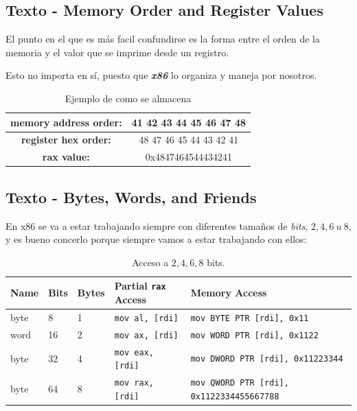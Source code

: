 \subsection{Texto - Memory Order and Register Values}\label{subsec:memory_order_and_register_values}

El punto en el que es más facil confundirse es la forma entre el orden de la
memoria y el valor que se imprime desde un registro.

Esto no importa en sí, puesto que \textbf{\textit{x86}} lo organiza y
maneja por nosotros.

\begin{table}[H]
	\begin{center}
		\begin{tabular}{cc}
			\toprule
			\textbf{memory address order: } & 41 42 43 44 45 46 47 48 \\
			\midrule
			\textbf{register hex order: }   & 48 47 46 45 44 43 42 41 \\
			\midrule
			\textbf{rax value: }            & 0x4847464544434241      \\
			\bottomrule
		\end{tabular}
	\end{center}
	\caption{Ejemplo de como se almacena}\label{tab:example_store_number_little_endian}
\end{table}

\subsection{Texto - Bytes, Words, and Friends}\label{subsec:bytes_words_and_friends}

En x86 se va a estar trabajando siempre con diferentes tamaños de \textit{bits},
\( 2,4,6\ u \ 8 \), y es bueno concerlo porque siempre vamos a estar
trabajando con ellos:

\begin{table}[htbp]
	\begin{center}
		\begin{tabular}[c]{|l|l|l|l|l|}
			\hline
			Name & Bits & Bytes & Partial \texttt{rax} Access & Memory Access                                              \\
			\hline
			byte & 8    & 1     & \texttt{mov al, [rdi]}      & \texttt{mov BYTE PTR [rdi], 0x11 }                \\
			\hline
			word & 16   & 2     & \texttt{mov ax, [rdi]}      & \texttt{mov WORD PTR [rdi], 0x1122 }              \\
			\hline
			byte & 32   & 4     & \texttt{mov eax, [rdi]}     & \texttt{mov DWORD PTR [rdi], 0x11223344 }         \\
			\hline
			byte & 64   & 8     & \texttt{mov rax, [rdi]}     & \texttt{mov QWORD PTR [rdi], 0x1122334455667788 } \\
			\hline
		\end{tabular}
	\end{center}
	\caption{Acceso a \( 2,4,6,8 \) bits.}\label{tab:access_common_bits}
\end{table}

